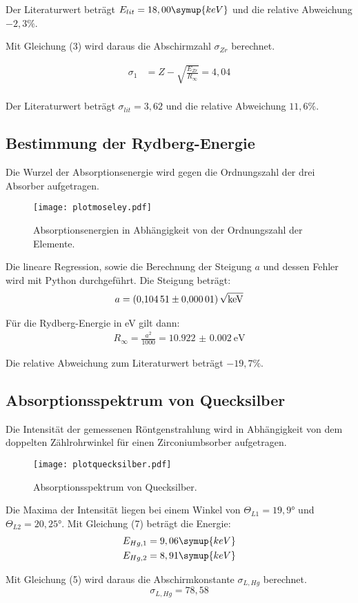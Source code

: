 Der Literaturwert beträgt $E_{lit} = 18,00 \symup{keV}$ und die relative Abweichung $-2,3\%$.

Mit Gleichung (3) wird daraus die Abschirmzahl $\sigma_{Zr}$  berechnet.

\begin{align*}
  \sigma_1 &= Z - \sqrt{\frac{E_{Zr}}{R_{\infty}}} = 4,04 \\
\end{align*}

Der Literaturwert beträgt $\sigma_{lit} = 3,62$ und die relative Abweichung $11,6\%$.


\subsection{Bestimmung der Rydberg-Energie}

Die Wurzel der Absorptionsenergie wird gegen die Ordnungszahl der drei Absorber aufgetragen.

\begin{figure}[H]
  \centering
  \texttt{[image: plotmoseley.pdf]}
  \caption{Absorptionsenergien in Abhängigkeit von der Ordnungszahl der Elemente.}
  \label{fig:plot}
\end{figure}

Die lineare Regression, sowie die Berechnung der Steigung $a$ und dessen Fehler wird mit Python durchgeführt.
Die Steigung beträgt:
\begin{align*}
  a = \SI{0.10451(1)}{\sqrt{\kilo\eV}}
\end{align*}

Für die Rydberg-Energie in eV gilt dann:
\begin{align*}
  R_{\infty} = \frac{a^2}{1000} =\SI{10.922(2)}{\eV}
\end{align*}

Die relative Abweichung zum Literaturwert beträgt $-19,7 \%$.


\subsection{Absorptionsspektrum von Quecksilber}

Die Intensität der gemessenen Röntgenstrahlung wird in Abhängigkeit von dem doppelten Zählrohrwinkel für
einen Zirconiumbsorber aufgetragen.

\begin{figure}[H]
  \centering
  \texttt{[image: plotquecksilber.pdf]}
  \caption{Absorptionsspektrum von Quecksilber.}
  \label{fig:plot}
\end{figure}


Die Maxima der Intensität liegen bei einem Winkel von $\Theta_{L1} = 19,9°$  und $\Theta_{L2} = 20,25°$.
Mit Gleichung (7) beträgt die Energie:
\begin{align*}
  E_{Hg,1} = 9,06 \symup{keV} \\
  E_{Hg,2} = 8,91 \symup{keV}
\end{align*}

Mit Gleichung (5) wird daraus die Abschirmkonstante $\sigma_{L, Hg}$ berechnet.
\begin{equation*}
  \sigma_{L, Hg} = 78,58
\end{equation*}
